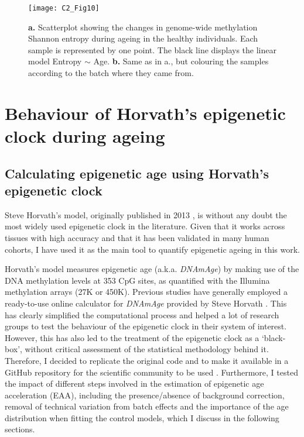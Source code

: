 \begin{figure}[htbp!] 
	\centering
	\vspace*{2mm}    
	\texttt{[image: C2\_Fig10]}
	\caption[Genome-wide methylation Shannon entropy during physiological ageing]{\textbf{a.} Scatterplot showing the changes in genome-wide methylation Shannon entropy during ageing in the healthy individuals. Each sample is represented by one point. The black line displays the linear model Entropy $\sim$ Age. \textbf{b.} Same as in a., but colouring the samples according to the batch where they came from.}
	\label{fig:c2_fig10}
\end{figure}


\smallskip

\section{Behaviour of Horvath's epigenetic clock during ageing}

\smallskip

\subsection{Calculating epigenetic age using Horvath's epigenetic clock} \label{s:2.2.1}

\smallskip

Steve Horvath's model, originally published in 2013 \citep{Horvath2013}, is without any doubt the most widely used epigenetic clock in the literature. Given that it works across tissues with high accuracy and that it has been validated in many human cohorts, I have used it as the main tool to quantify epigenetic ageing in this work. 

\bigskip

Horvath's model measures epigenetic age (a.k.a. \textit{DNAmAge}) by making use of the DNA methylation levels at 353 CpG sites, as quantified with the Illumina methylation arrays (27K or 450K). Previous studies have generally employed a ready-to-use online calculator for \textit{DNAmAge} provided by Steve Horvath \citep{Horvath2013b}. This has clearly simplified the computational process and helped a lot of research groups to test the behaviour of the epigenetic clock in their system of interest. However, this has also led to the treatment of the epigenetic clock as a `black-box’, without critical assessment of the statistical methodology behind it. Therefore, I decided to replicate the original code and to make it available in a GitHub repository for the scientific community to be used \citep{Martin-Herranz2019}. Furthermore, I tested the impact of different steps involved in the estimation of epigenetic age acceleration (EAA), including the presence/absence of background correction, removal of technical variation from batch effects and the importance of the age distribution when fitting the control models, which I discuss in the following sections. 

